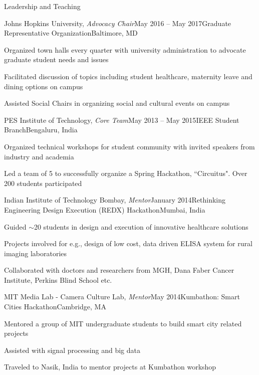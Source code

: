 \documentclass{resume}
\begin{document}
  \begin{rSection}{Leadership and Teaching}
          \begin{rSubsection}{Johns Hopkins University, \textit{Advocacy Chair}}{May 2016 -- May 2017}{Graduate Representative Organization}{Baltimore, MD}
\item Organized town halls every quarter with university administration to advocate graduate student needs and issues
\item Facilitated discussion of topics including student healthcare, maternity leave and dining options on campus
\item Assisted Social Chairs in organizing social and cultural events on campus
    \end{rSubsection}

\begin{rSubsection}{PES Institute of Technology, \textit{Core Team}}{May 2013 -- May 2015}{IEEE Student Branch}{Bengaluru, India}
\item Organized technical workshops for student community with invited speakers from industry and academia
\item Led a team of 5 to successfully organize a Spring Hackathon, ``Circuitus". Over 200 students participated
    \end{rSubsection}

\begin{rSubsection}{Indian Institute of Technology Bombay, \textit{Mentor}}{January 2014}{Rethinking Engineering Design Execution (REDX) Hackathon}{Mumbai, India}
\item Guided $\sim$20 students in design and execution of innovative healthcare solutions
\item Projects involved for e.g., design of low cost, data driven ELISA system for rural imaging laboratories
\item Collaborated with doctors and researchers from MGH, Dana Faber Cancer Institute, Perkins Blind School etc.
    \end{rSubsection}

\begin{rSubsection}{MIT Media Lab - Camera Culture Lab, \textit{Mentor}}{May 2014}{Kumbathon: Smart Cities Hackathon}{Cambridge, MA}
\item Mentored a group of MIT undergraduate students to build smart city related projects 
\item Assisted with signal processing and big data
\item Traveled to Nasik, India to mentor projects at Kumbathon workshop
    \end{rSubsection}
  \end{rSection}   
\end{document}
